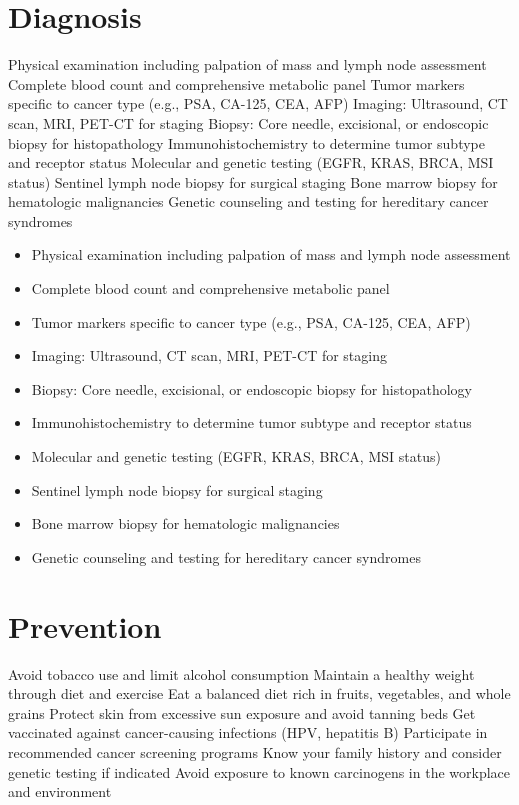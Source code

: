\section{Diagnosis}
Physical examination including palpation of mass and lymph node assessment Complete blood count and comprehensive metabolic panel Tumor markers specific to cancer type (e.g., PSA, CA-125, CEA, AFP) Imaging: Ultrasound, CT scan, MRI, PET-CT for staging Biopsy: Core needle, excisional, or endoscopic biopsy for histopathology Immunohistochemistry to determine tumor subtype and receptor status Molecular and genetic testing (EGFR, KRAS, BRCA, MSI status) Sentinel lymph node biopsy for surgical staging Bone marrow biopsy for hematologic malignancies Genetic counseling and testing for hereditary cancer syndromes

\begin{itemize}[noitemsep]
  \item Physical examination including palpation of mass and lymph node assessment
  \item Complete blood count and comprehensive metabolic panel
  \item Tumor markers specific to cancer type (e.g., PSA, CA-125, CEA, AFP)
  \item Imaging: Ultrasound, CT scan, MRI, PET-CT for staging
  \item Biopsy: Core needle, excisional, or endoscopic biopsy for histopathology
  \item Immunohistochemistry to determine tumor subtype and receptor status
  \item Molecular and genetic testing (EGFR, KRAS, BRCA, MSI status)
  \item Sentinel lymph node biopsy for surgical staging
  \item Bone marrow biopsy for hematologic malignancies
  \item Genetic counseling and testing for hereditary cancer syndromes
\end{itemize}
\section{Prevention}
Avoid tobacco use and limit alcohol consumption Maintain a healthy weight through diet and exercise Eat a balanced diet rich in fruits, vegetables, and whole grains Protect skin from excessive sun exposure and avoid tanning beds Get vaccinated against cancer-causing infections (HPV, hepatitis B) Participate in recommended cancer screening programs Know your family history and consider genetic testing if indicated Avoid exposure to known carcinogens in the workplace and environment

